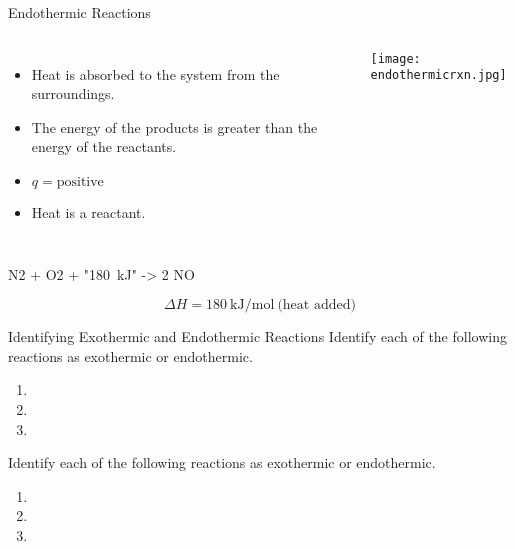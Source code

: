 \documentclass[11pt,letterpaper]{article}
\begin{document}

\begin{frame}{Endothermic Reactions}
	\begin{columns}
		\begin{itemize}
			\item Heat is absorbed to the system from the
				surroundings.
			\item The energy of the products is greater than the
				energy of the reactants.
			\item $q = \text{positive}$
			\item Heat is a \alert{reactant}.
		\end{itemize}
		\begin{center}
			\texttt{[image: endothermicrxn.jpg]}
		\end{center}
	\end{columns}

	\bigskip

	\begin{reaction*}
		N2\gas{} + O2\gas{} + "\SI{180}{\kilo\joule}" -> 2
		NO\gas{}
	\end{reaction*}
	\begin{equation*}
		\Delta H = \SI{180}{\kilo\joule\per\mole}~\text{(heat
		added)}
	\end{equation*}
\end{frame}


\begin{frame}[t]{Identifying Exothermic and Endothermic Reactions}
	Identify each of the following reactions as exothermic or endothermic.
	\begin{enumerate}
		\item {}
		\item {}
		\item {}
	\end{enumerate}
\end{frame}


\begin{onyourown}[0em]
	Identify each of the following reactions as exothermic or endothermic.
	\begin{enumerate}
		\item {}
		\item {}
		\item {}
	\end{enumerate}
\end{onyourown}
\end{document}
